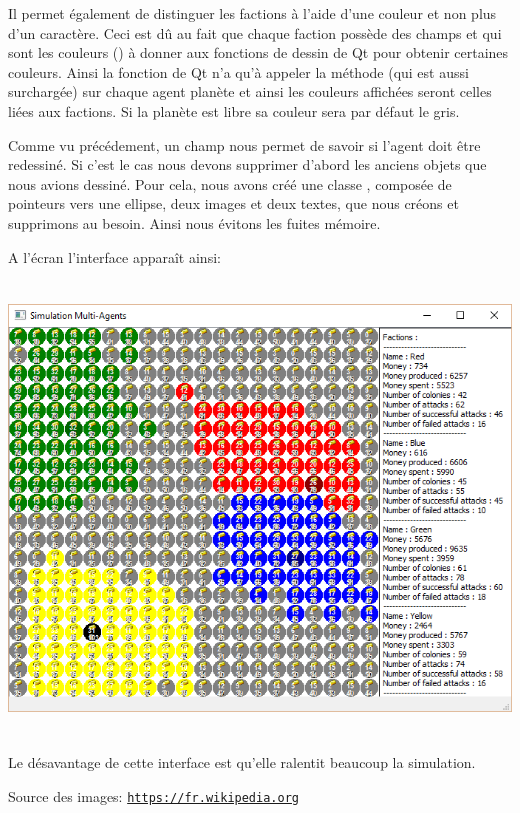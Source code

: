   Il permet également de distinguer les factions à l’aide d’une couleur et non plus d’un caractère. Ceci est dû au fait que chaque faction possède des champs  et  qui sont les couleurs () à donner aux fonctions de dessin de Qt pour obtenir certaines couleurs. Ainsi la fonction de Qt n’a qu’à appeler la méthode  (qui est aussi surchargée) sur chaque agent planète et ainsi les couleurs affichées seront celles liées aux factions. Si la planète est libre sa couleur sera par défaut le gris.
  
  Comme vu précédement, un champ  nous permet de savoir si l’agent doit être redessiné. Si c’est le cas nous devons supprimer d’abord les anciens objets que nous avions dessiné. Pour cela, nous avons créé une classe , composée de pointeurs vers une ellipse, deux images et deux textes, que nous créons et supprimons au besoin. Ainsi nous évitons les fuites mémoire.
  
  A l’écran l’interface apparaît ainsi:
  \begin{center}
    \includegraphics[height=12cm]{images/gui.png}
  \end{center}

  Le désavantage de cette interface est qu’elle ralentit beaucoup la simulation.

  Source des images: \href{https://fr.wikipedia.org}{\texttt{https://fr.wikipedia.org}}
